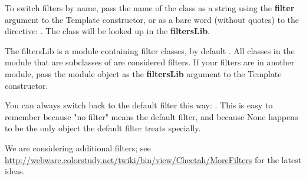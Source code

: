 To switch filters by name, pass the name of the class as a string using the
{\bf filter} argument to the Template constructor, or as a bare word (without
quotes) to the  directive: .  The
class will be looked up in the {\bf filtersLib}.

The filtersLib is a module containing filter classes, by default
.  All classes in the module that are subclasses of
 are considered filters.  If your filters are in
another module, pass the module object as the {\bf filtersLib} argument to the
Template constructor.

You can always switch back to the default filter this way:
.  This is easy to remember because "no filter" means the
default filter, and because None happens to be the only object the default
filter treats specially.

We are considering additional filters; see
\url{http://webware.colorstudy.net/twiki/bin/view/Cheetah/MoreFilters}
for the latest ideas.






